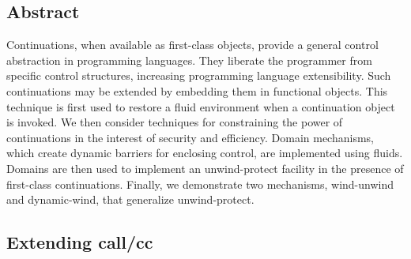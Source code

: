 \documentclass[letterpaper]{llncs}
\begin{document}
\subsection*{Abstract}
Continuations, when available as first-class objects, provide a general control abstraction in programming languages. They liberate the programmer from specific control structures, increasing programming language extensibility. Such continuations may be extended by embedding them in functional objects. This technique is first used to restore a fluid environment when a continuation object is invoked. We then consider techniques for constraining the power of continuations in the interest of security and efficiency. Domain mechanisms, which create dynamic barriers for enclosing control, are implemented using fluids. Domains are then used to implement an unwind-protect facility in the presence of first-class continuations. Finally, we demonstrate two mechanisms, wind-unwind and dynamic-wind, that generalize unwind-protect.

\subsection*{Extending call/cc}
\end{document}
